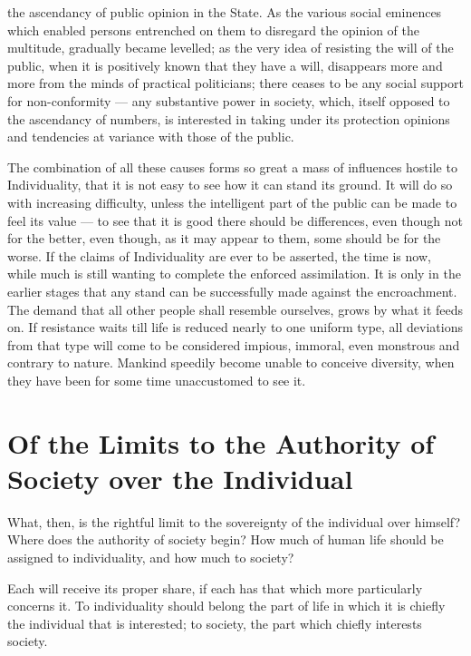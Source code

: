\documentclass[12pt]{report}
\begin{document}
the ascendancy of public opinion in the State. As the various social eminences which enabled persons entrenched on them to disregard the opinion of the multitude, gradually became levelled; as the very idea of resisting the will of the public, when it is positively known that they have a will, disappears more and more from the minds of practical politicians; there ceases to be any social support for non-conformity — any substantive power in society, which, itself opposed to the ascendancy of numbers, is interested in taking under its protection opinions and tendencies at variance with those of the public.

The combination of all these causes forms so great a mass of influences hostile to Individuality, that it is not easy to see how it can stand its ground. It will do so with increasing difficulty, unless the intelligent part of the public can be made to feel its value — to see that it is good there should be differences, even though not for the better, even though, as it may appear to them, some should be for the worse. If the claims of Individuality are ever to be asserted, the time is now, while much is still wanting to complete the enforced assimilation. It is only in the earlier stages that any stand can be successfully made against the encroachment. The demand that all other people shall resemble ourselves, grows by what it feeds on. If resistance waits till life is reduced nearly to one uniform type, all deviations from that type will come to be considered impious, immoral, even monstrous and contrary to nature. Mankind speedily become unable to conceive diversity, when they have been for some time unaccustomed to see it.

\chapter{Of the Limits to the Authority of Society over the Individual}
What, then, is the rightful limit to the sovereignty of the individual over himself? Where does the authority of society begin? How much of human life should be assigned to individuality, and how much to society?

Each will receive its proper share, if each has that which more particularly concerns it. To individuality should belong the part of life in which it is chiefly the individual that is interested; to society, the part which chiefly interests society.
\end{document}
